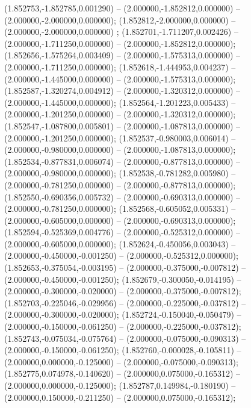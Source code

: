  (1.852753,-1.852785,0.001290) -- (2.000000,-1.852812,0.000000) -- (2.000000,-2.000000,0.000000);
 (1.852812,-2.000000,0.000000) -- (2.000000,-2.000000,0.000000) ;
 (1.852701,-1.711207,0.002426) -- (2.000000,-1.711250,0.000000) -- (2.000000,-1.852812,0.000000);
 (1.852656,-1.575264,0.003409) -- (2.000000,-1.575313,0.000000) -- (2.000000,-1.711250,0.000000);
 (1.852618,-1.444953,0.004237) -- (2.000000,-1.445000,0.000000) -- (2.000000,-1.575313,0.000000);
 (1.852587,-1.320274,0.004912) -- (2.000000,-1.320312,0.000000) -- (2.000000,-1.445000,0.000000);
 (1.852564,-1.201223,0.005433) -- (2.000000,-1.201250,0.000000) -- (2.000000,-1.320312,0.000000);
 (1.852547,-1.087800,0.005801) -- (2.000000,-1.087813,0.000000) -- (2.000000,-1.201250,0.000000);
 (1.852537,-0.980003,0.006014) -- (2.000000,-0.980000,0.000000) -- (2.000000,-1.087813,0.000000);
 (1.852534,-0.877831,0.006074) -- (2.000000,-0.877813,0.000000) -- (2.000000,-0.980000,0.000000);
 (1.852538,-0.781282,0.005980) -- (2.000000,-0.781250,0.000000) -- (2.000000,-0.877813,0.000000);
 (1.852550,-0.690356,0.005732) -- (2.000000,-0.690313,0.000000) -- (2.000000,-0.781250,0.000000);
 (1.852568,-0.605052,0.005331) -- (2.000000,-0.605000,0.000000) -- (2.000000,-0.690313,0.000000);
 (1.852594,-0.525369,0.004776) -- (2.000000,-0.525312,0.000000) -- (2.000000,-0.605000,0.000000);
 (1.852624,-0.450056,0.003043) -- (2.000000,-0.450000,-0.001250) -- (2.000000,-0.525312,0.000000);
 (1.852653,-0.375054,-0.003195) -- (2.000000,-0.375000,-0.007812) -- (2.000000,-0.450000,-0.001250);
 (1.852679,-0.300050,-0.014195) -- (2.000000,-0.300000,-0.020000) -- (2.000000,-0.375000,-0.007812);
 (1.852703,-0.225046,-0.029956) -- (2.000000,-0.225000,-0.037812) -- (2.000000,-0.300000,-0.020000);
 (1.852724,-0.150040,-0.050479) -- (2.000000,-0.150000,-0.061250) -- (2.000000,-0.225000,-0.037812);
 (1.852743,-0.075034,-0.075764) -- (2.000000,-0.075000,-0.090313) -- (2.000000,-0.150000,-0.061250);
 (1.852760,-0.000028,-0.105811) -- (2.000000,0.000000,-0.125000) -- (2.000000,-0.075000,-0.090313);
 (1.852775,0.074978,-0.140620) -- (2.000000,0.075000,-0.165312) -- (2.000000,0.000000,-0.125000);
 (1.852787,0.149984,-0.180190) -- (2.000000,0.150000,-0.211250) -- (2.000000,0.075000,-0.165312);
